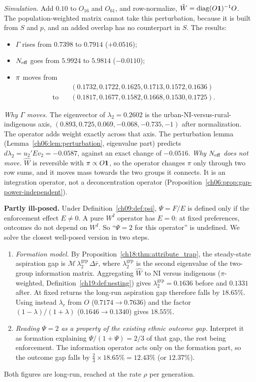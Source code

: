 \documentclass[../solutions_manual.tex]{subfiles}
\begin{document}
 \emph{Simulation.} Add $0.10$ to $O_{16}$ and $O_{61}$, and row-normalize, $\hat W = \operatorname{diag}(O\mathbf{1})^{-1}O$. The population-weighted matrix cannot take this perturbation, because it is built from $S$ and $p$, and an added overlap has no counterpart in $S$. The results:
\begin{itemize}
\item $\Gamma$ rises from $0.7398$ to $0.7914$ ($+0.0516$);
\item $N_{\text{eff}}$ goes from $5.9924$ to $5.9814$ ($-0.0110$);
\item $\pi$ moves from
\begin{align*}
&(0.1732, 0.1722, 0.1625, 0.1713, 0.1572, 0.1636)\\
\text{to}\quad &(0.1817, 0.1677, 0.1582, 0.1668, 0.1530, 0.1725).
\end{align*}
\end{itemize}
\emph{Why $\Gamma$ moves.} The eigenvector of $\lambda_2 = 0.2602$ is the urban-NI-versus-rural-indigenous axis, $(0.893, 0.725, 0.069, -0.068, -0.735, -1)$ after normalization. The operator adds weight exactly across that axis. The perturbation lemma (Lemma~\ref{ch06:lem:perturbation}, eigenvalue part) predicts $d\lambda_2 = u_2'Ev_2 = -0.0587$, against an exact change of $-0.0516$. \emph{Why $N_{\text{eff}}$ does not move.} $\hat W$ is reversible with $\pi \propto O\mathbf{1}$, so the operator changes $\pi$ only through two row sums, and it moves mass towards the two groups it connects. It is an integration operator, not a deconcentration operator (Proposition~\ref{ch06:prop:gap-power-independent}).

 \textbf{Partly ill-posed.} Under Definition~\ref{ch09:def:psi}, $\Psi = F/E$ is defined only if the enforcement effect $E \ne 0$. A pure $W^I$ operator has $E = 0$: at fixed preferences, outcomes do not depend on $W^I$. So ``$\Psi = 2$ for this operator'' is undefined. We solve the closest well-posed version in two steps.
\begin{enumerate}
\item \emph{Formation model.} By Proposition~\ref{ch18:thm:attribute_trap}, the steady-state aspiration gap is $\mathcal M\,\lambda_2^{\text{grp}}\,\Delta\bar r$, where $\lambda_2^{\text{grp}}$ is the second eigenvalue of the two-group information matrix. Aggregating $\hat W$ to NI versus indigenous ($\pi$-weighted, Definition~\ref{ch19:def:nesting}) gives $\lambda_2^{\text{grp}} = 0.1636$ before and $0.1331$ after. At fixed returns the long-run aspiration gap therefore falls by $18.65\%$. Using instead $\lambda_r$ from $O$ ($0.7174 \to 0.7636$) and the factor $(1-\lambda)/(1+\lambda)$ ($0.1646 \to 0.1340$) gives $18.55\%$.
\item \emph{Reading $\Psi = 2$ as a property of the existing ethnic outcome gap.} Interpret it as formation explaining $\Psi/(1+\Psi) = 2/3$ of that gap, the rest being enforcement. The information operator acts only on the formation part, so the outcome gap falls by $\tfrac23 \times 18.65\% = 12.43\%$ (or $12.37\%$).
\end{enumerate}
Both figures are long-run, reached at the rate $\rho$ per generation.
\end{document}
